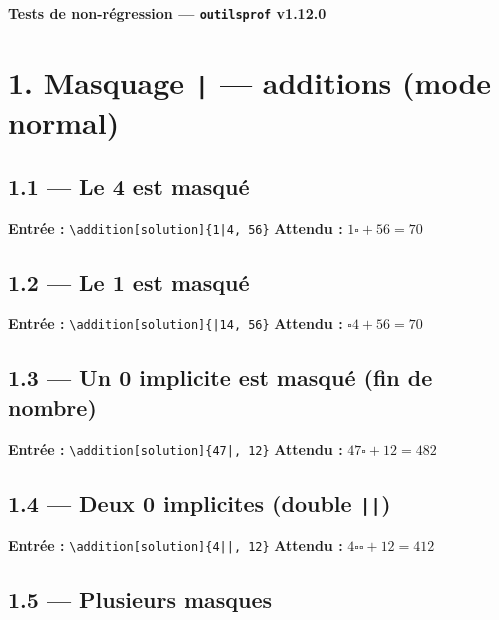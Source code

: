 \documentclass[12pt]{extarticle}
\newcommand{\grise}{\ensuremath{\square}}
\begin{document}
\begin{center}
  {\Large\bfseries Tests de non-régression — \texttt{outilsprof} v1.12.0}
\end{center}

\section*{1. Masquage \texttt{|} — additions (mode normal)}

\subsection*{1.1 — Le 4 est masqué}

\textbf{Entrée :} \verb!\addition[solution]{1|4, 56}!
\quad\textbf{Attendu :} $1\grise + 56 = 70$


\subsection*{1.2 — Le 1 est masqué}

\textbf{Entrée :} \verb!\addition[solution]{|14, 56}!
\quad\textbf{Attendu :} $\grise 4 + 56 = 70$


\subsection*{1.3 — Un 0 implicite est masqué (fin de nombre)}

\textbf{Entrée :} \verb!\addition[solution]{47|, 12}!
\quad\textbf{Attendu :} $47\grise + 12 = 482$


\subsection*{1.4 — Deux 0 implicites (double \texttt{||})}

\textbf{Entrée :} \verb!\addition[solution]{4||, 12}!
\quad\textbf{Attendu :} $4\grise\grise + 12 = 412$


\subsection*{1.5 — Plusieurs masques}
\end{document}

